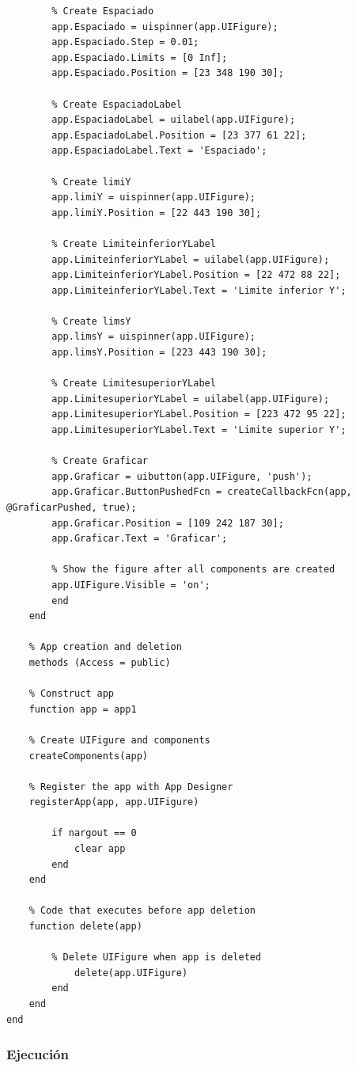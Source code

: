 \documentclass{article}
\begin{document}
\begin{lstlisting}
		% Create Espaciado
		app.Espaciado = uispinner(app.UIFigure);
		app.Espaciado.Step = 0.01;
		app.Espaciado.Limits = [0 Inf];
		app.Espaciado.Position = [23 348 190 30];
		
		% Create EspaciadoLabel
		app.EspaciadoLabel = uilabel(app.UIFigure);
		app.EspaciadoLabel.Position = [23 377 61 22];
		app.EspaciadoLabel.Text = 'Espaciado';
		
		% Create limiY
		app.limiY = uispinner(app.UIFigure);
		app.limiY.Position = [22 443 190 30];
		
		% Create LimiteinferiorYLabel
		app.LimiteinferiorYLabel = uilabel(app.UIFigure);
		app.LimiteinferiorYLabel.Position = [22 472 88 22];
		app.LimiteinferiorYLabel.Text = 'Limite inferior Y';
		
		% Create limsY
		app.limsY = uispinner(app.UIFigure);
		app.limsY.Position = [223 443 190 30];
		
		% Create LimitesuperiorYLabel
		app.LimitesuperiorYLabel = uilabel(app.UIFigure);
		app.LimitesuperiorYLabel.Position = [223 472 95 22];
		app.LimitesuperiorYLabel.Text = 'Limite superior Y';
		
		% Create Graficar
		app.Graficar = uibutton(app.UIFigure, 'push');
		app.Graficar.ButtonPushedFcn = createCallbackFcn(app, @GraficarPushed, true);
		app.Graficar.Position = [109 242 187 30];
		app.Graficar.Text = 'Graficar';
		
		% Show the figure after all components are created
		app.UIFigure.Visible = 'on';
		end
	end
	
	% App creation and deletion
	methods (Access = public)
	
	% Construct app
	function app = app1
	
	% Create UIFigure and components
	createComponents(app)
	
	% Register the app with App Designer
	registerApp(app, app.UIFigure)
	
		if nargout == 0
			clear app
		end
	end
	
	% Code that executes before app deletion
	function delete(app)
	
		% Delete UIFigure when app is deleted
			delete(app.UIFigure)
		end
	end
end
	\end{lstlisting}
	
	\subsubsection{Ejecución}
	
\end{document}

